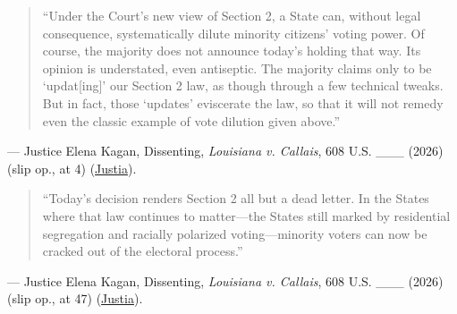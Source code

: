 \documentclass[12pt]{article}
\begin{document}
\begin{quote}
``Under the Court's new view of Section 2, a State can, without legal consequence, systematically dilute minority citizens' voting power. Of course, the majority does not announce today's holding that way. Its opinion is understated, even antiseptic. The majority claims only to be `updat[ing]' our Section 2 law, as though through a few technical tweaks. But in fact, those `updates' eviscerate the law, so that it will not remedy even the classic example of vote dilution given above.''
\end{quote}
\noindent --- Justice Elena Kagan, Dissenting, \textit{Louisiana v. Callais}, 608 U.S. \_\_\_ (2026) (slip op., at 4) (\href{https://supreme.justia.com/cases/federal/us/608/24-109/}{Justia}).

\begin{quote}
``Today's decision renders Section 2 all but a dead letter. In the States where that law continues to matter---the States still marked by residential segregation and racially polarized voting---minority voters can now be cracked out of the electoral process.''
\end{quote}
\noindent --- Justice Elena Kagan, Dissenting, \textit{Louisiana v. Callais}, 608 U.S. \_\_\_ (2026) (slip op., at 47) (\href{https://supreme.justia.com/cases/federal/us/608/24-109/}{Justia}).
\end{document}
